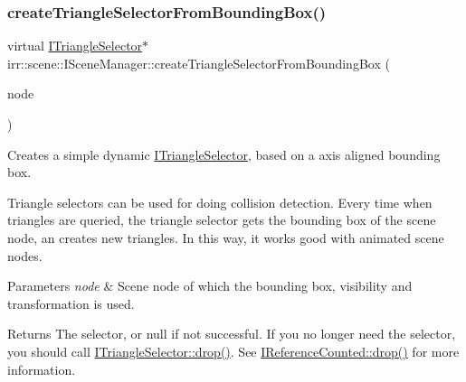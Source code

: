 \subsubsection{\texorpdfstring{create\+Triangle\+Selector\+From\+Bounding\+Box()}{createTriangleSelectorFromBoundingBox()}\hspace{0.1cm}{\footnotesize\ttfamily [1/2]}}
{\footnotesize\ttfamily virtual \hyperlink{classirr_1_1scene_1_1ITriangleSelector}{I\+Triangle\+Selector}$\ast$ irr\+::scene\+::\+I\+Scene\+Manager\+::create\+Triangle\+Selector\+From\+Bounding\+Box (\begin{DoxyParamCaption}\item[{\hyperlink{classirr_1_1scene_1_1ISceneNode}{I\+Scene\+Node} $\ast$}]{node }\end{DoxyParamCaption})\hspace{0.3cm}{\ttfamily [pure virtual]}}



Creates a simple dynamic \hyperlink{classirr_1_1scene_1_1ITriangleSelector}{I\+Triangle\+Selector}, based on a axis aligned bounding box. 

Triangle selectors can be used for doing collision detection. Every time when triangles are queried, the triangle selector gets the bounding box of the scene node, an creates new triangles. In this way, it works good with animated scene nodes. 
\begin{DoxyParams}{Parameters}
{\em node} & Scene node of which the bounding box, visibility and transformation is used. \\
\hline
\end{DoxyParams}
\begin{DoxyReturn}{Returns}
The selector, or null if not successful. If you no longer need the selector, you should call \hyperlink{classirr_1_1IReferenceCounted_a03856a09355b89d178090c4a5f738543}{I\+Triangle\+Selector\+::drop()}. See \hyperlink{classirr_1_1IReferenceCounted_a03856a09355b89d178090c4a5f738543}{I\+Reference\+Counted\+::drop()} for more information. 
\end{DoxyReturn}
\mbox{\label{classirr_1_1scene_1_1ISceneManager_adb717113b4203e92f2bd95c84488059c}} 
